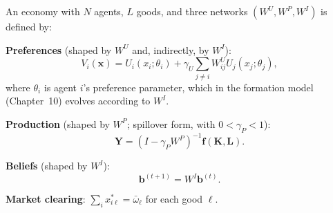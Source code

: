 \documentclass[../structural_economics_book.tex]{subfiles}
\begin{document}
\begin{definition}\label{ch05:def:full_model}
An economy with $N$ agents, $L$ goods, and three networks $(W^U, W^P, W^I)$ is defined by:

\textbf{Preferences} (shaped by $W^U$ and, indirectly, by $W^I$):
\begin{equation}\label{ch05:eq:full_utility}
V_i(\mathbf{x}) = U_i(x_i; \theta_i) + \gamma_U \sum_{j \neq i} W^U_{ij} U_j(x_j; \theta_j),
\end{equation}
where $\theta_i$ is agent $i$'s preference parameter, which in the formation model (Chapter~10) evolves according to $W^I$.

\textbf{Production} (shaped by $W^P$; spillover form, with $0 < \gamma_P < 1$):
\begin{equation}\label{ch05:eq:full_production}
\mathbf{Y} = (I - \gamma_P W^P)^{-1} \mathbf{f}(\mathbf{K}, \mathbf{L}).
\end{equation}

\textbf{Beliefs} (shaped by $W^I$):
\begin{equation}\label{ch05:eq:full_beliefs}
\mathbf{b}^{(t+1)} = W^I \mathbf{b}^{(t)}.
\end{equation}

\textbf{Market clearing}: $\sum_i x_{i\ell}^* = \bar{\omega}_\ell$ for each good $\ell$.
\end{definition}
\end{document}
